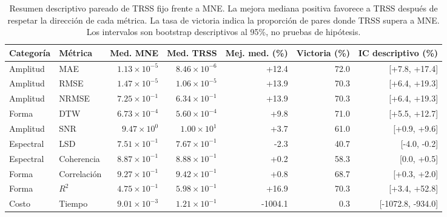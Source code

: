 \begin{table}[htbp]
\centering
\scriptsize
\setlength{\tabcolsep}{2pt}
\caption{Resumen descriptivo pareado de TRSS fijo frente a MNE. La mejora mediana positiva favorece a TRSS después de respetar la dirección de cada métrica. La tasa de victoria indica la proporción de pares donde TRSS supera a MNE. Los intervalos son bootstrap descriptivos al 95\%, no pruebas de hipótesis.}
\label{tab:ch4_descriptive_trss_mne}
\begin{tabular}{@{}p{1.45cm}p{1.45cm}rrrrr@{}}
\toprule
Categoría & Métrica & Med. MNE & Med. TRSS & Mej. med. (\%) & Victoria (\%) & IC descriptivo (\%) \\
\midrule
Amplitud & MAE & $1.13\times 10^{-5}$ & $8.46\times 10^{-6}$ & +12.4 & 72.0 & [+7.8, +17.4] \\
Amplitud & RMSE & $1.47\times 10^{-5}$ & $1.06\times 10^{-5}$ & +13.9 & 70.3 & [+6.4, +19.3] \\
Amplitud & NRMSE & $7.25\times 10^{-1}$ & $6.34\times 10^{-1}$ & +13.9 & 70.3 & [+6.4, +19.3] \\
Forma & DTW & $6.73\times 10^{-4}$ & $5.60\times 10^{-4}$ & +9.8 & 71.0 & [+5.5, +12.7] \\
Amplitud & SNR & $9.47\times 10^{0}$ & $1.00\times 10^{1}$ & +3.7 & 61.0 & [+0.9, +9.6] \\
Espectral & LSD & $7.51\times 10^{-1}$ & $7.67\times 10^{-1}$ & -2.3 & 40.7 & [-4.0, -0.2] \\
Espectral & Coherencia & $8.87\times 10^{-1}$ & $8.88\times 10^{-1}$ & +0.2 & 58.3 & [0.0, +0.5] \\
Forma & Correlación & $9.27\times 10^{-1}$ & $9.42\times 10^{-1}$ & +0.8 & 68.7 & [+0.3, +2.0] \\
Forma & $R^2$ & $4.75\times 10^{-1}$ & $5.98\times 10^{-1}$ & +16.9 & 70.3 & [+3.4, +52.8] \\
Costo & Tiempo & $9.01\times 10^{-3}$ & $1.21\times 10^{-1}$ & -1004.1 & 0.3 & [-1072.8, -934.0] \\
\bottomrule
\end{tabular}
\end{table}
